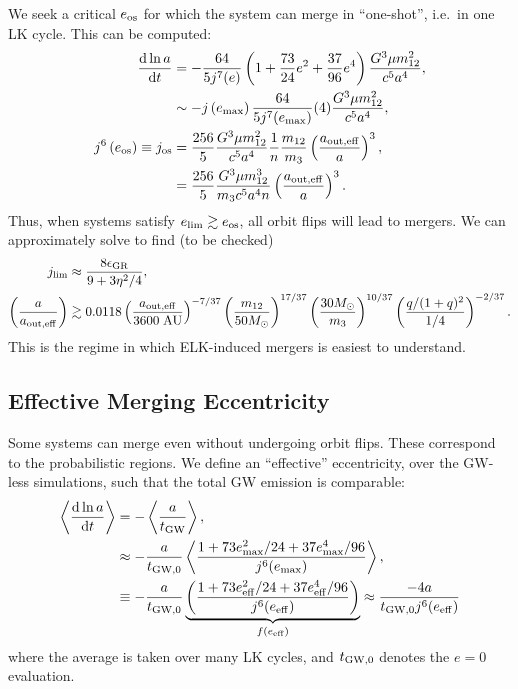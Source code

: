 \documentclass[11pt,
        usenames, %
        dvipsnames %
    ]{article}
\newcommand*{\rd}[2]{\frac{\mathrm{d}#1}{\mathrm{d}#2}}
\newcommand*{\ev}[1]{\left\langle#1\right\rangle}
\newcommand*{\p}[1]{\left(#1\right)}
\begin{document}
We seek a critical $e_{\rm os}$ for which the system can merge in ``one-shot'',
i.e.\ in one LK cycle. This can be computed:
\begin{align}
    \rd{\ln a}{t} &= -\frac{64}{5j^7(e)}\p{1 + \frac{73}{24}e^2 +
        \frac{37}{96}e^4}\frac{G^3 \mu m_{12}^2}{c^5a^4},\\
        &\sim -j\p{e_{\max}}\frac{64}{5j^7(e_{\max})}
            (4) \frac{G^3\mu m_{12}^2}{c^5a^4},\\
    j^6\p{e_{\rm os}} \equiv j_{\rm os}
        &= \frac{256}{5}\frac{G^3 \mu m_{12}^2}{c^5a^4}
            \frac{1}{n}\frac{m_{12}}{m_3}\p{\frac{a_{\rm out,
            eff}}{a}}^3,\\
        &= \frac{256}{5}\frac{G^3 \mu m_{12}^3}{m_3c^5a^4n}
            \p{\frac{a_{\rm out, eff}}{a}}^3.
\end{align}
Thus, when systems satisfy $e_{\lim} \gtrsim e_{\rm os}$, all orbit flips will
lead to mergers. We can approximately solve to find (to be checked)
\begin{align}
    j_{\lim} &\approx \frac{8\epsilon_{\rm GR}}{9 + 3\eta^2/4},\\
    \p{\frac{a}{a_{\rm out, eff}}} &\gtrsim
        0.0118
        \p{\frac{a_{\rm out, eff}}{3600\;\mathrm{AU}}}^{-7/37}
        \p{\frac{m_{12}}{50M_{\odot}}}^{17/37}
        \p{\frac{30M_{\odot}}{m_3}}^{10/37}
        \p{\frac{q / (1 + q)^2}{1/4}}^{-2/37}.
\end{align}
This is the regime in which ELK-induced mergers is easiest to understand.

\subsection{Effective Merging Eccentricity}

Some systems can merge even without undergoing orbit flips. These correspond to
the probabilistic regions. We define an ``effective'' eccentricity, over the
GW-less simulations, such that the total GW emission is comparable:
\begin{align}
    \ev{\rd{\ln a}{t}} &= -\ev{\frac{a}{t_{\rm GW}}},\\
        &\approx -\frac{a}{t_{\rm GW, 0}}
            \ev{\frac{1 + 73e_{\max}^2/24 + 37e_{\max}^4/96}
                {j^6(e_{\max})}},\\
        &\equiv -\frac{a}{t_{\rm GW,0}}
            \underbrace{\p{\frac{1 + 73e_{\rm eff}^2/24 + 37e_{\rm
            eff}^4/96}{j^6(e_{\rm eff})}}}_{f\p{e_{\rm eff}}}
            \approx \frac{-4a}{t_{\rm GW, 0}j^6(e_{\rm eff})}\label{eq:e_eff}
\end{align}
where the average is taken over many LK cycles, and $t_{\rm GW, 0}$
denotes the $e = 0$ evaluation.
\end{document}
